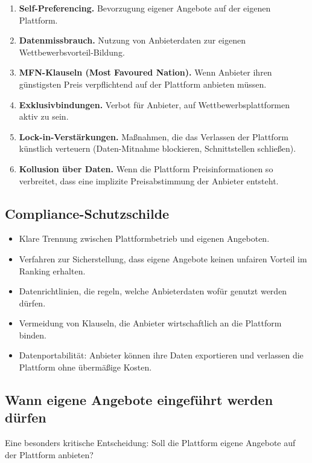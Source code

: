 \documentclass[11pt,a4paper,oneside]{article}
\newcommand{\fachbegriff}[1]{\textbf{#1}}
\begin{document}
\begin{enumerate}
  \item \fachbegriff{Self-Preferencing.} Bevorzugung eigener Angebote auf der eigenen Plattform.
  \item \fachbegriff{Datenmissbrauch.} Nutzung von Anbieterdaten zur eigenen Wettbewerbsvorteil-Bildung.
  \item \fachbegriff{MFN-Klauseln (Most Favoured Nation).} Wenn Anbieter ihren günstigsten Preis verpflichtend auf der Plattform anbieten müssen.
  \item \fachbegriff{Exklusivbindungen.} Verbot für Anbieter, auf Wettbewerbsplattformen aktiv zu sein.
  \item \fachbegriff{Lock-in-Verstärkungen.} Maßnahmen, die das Verlassen der Plattform künstlich verteuern (Daten-Mitnahme blockieren, Schnittstellen schließen).
  \item \fachbegriff{Kollusion über Daten.} Wenn die Plattform Preisinformationen so verbreitet, dass eine implizite Preisabstimmung der Anbieter entsteht.
\end{enumerate}

\subsection{Compliance-Schutzschilde}

\begin{itemize}
  \item Klare Trennung zwischen Plattformbetrieb und eigenen Angeboten.
  \item Verfahren zur Sicherstellung, dass eigene Angebote keinen unfairen Vorteil im Ranking erhalten.
  \item Datenrichtlinien, die regeln, welche Anbieterdaten wofür genutzt werden dürfen.
  \item Vermeidung von Klauseln, die Anbieter wirtschaftlich an die Plattform binden.
  \item Datenportabilität: Anbieter können ihre Daten exportieren und verlassen die Plattform ohne übermäßige Kosten.
\end{itemize}

\subsection{Wann eigene Angebote eingeführt werden dürfen}

Eine besonders kritische Entscheidung: Soll die Plattform eigene Angebote auf der Plattform anbieten?
\end{document}
